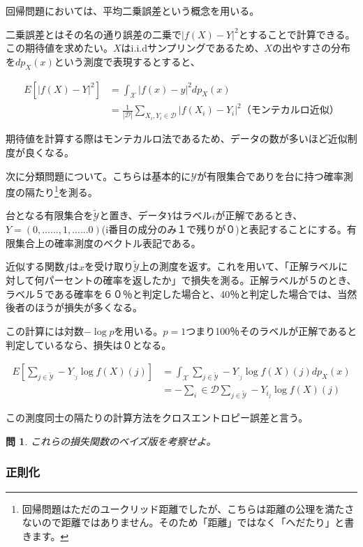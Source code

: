 \documentclass{jsarticle}
\newtheorem{pro}{問}[section]
\begin{document}
回帰問題においては、平均二乗誤差という概念を用いる。

二乗誤差とはその名の通り誤差の二乗で$|f(X)-Y|^2$とすることで計算できる。この期待値を求めたい。$X$はi.i.dサンプリングであるため、$X$の出やすさの分布を$dp_X(x)$という測度で表現するとすると、

\begin{align}
E[|f(X)-Y|^2]&=\int_\mathcal{X}|f(x)-y|^2dp_X(x)\\
&=\frac{1}{|\mathcal{D}|}\sum_{X_i,Y_i\in \mathcal{D}} |f(X_i)-Y_i|^2　（モンテカルロ近似）
\end{align}

期待値を計算する際はモンテカルロ法であるため、データの数が多いほど近似制度が良くなる。


次に分類問題について。こちらは基本的に$\mathcal{Y}$が有限集合でありを台に持つ確率測度の隔たり\footnote{回帰問題はただのユークリッド距離でしたが、こちらは距離の公理を満たさないので距離ではありません。そのため「距離」ではなく「へだたり」と書きます。}を測る。

台となる有限集合を$\tilde{\mathcal{Y}}$と置き、データ$Y$はラベル$i$が正解であるとき、$Y=(0,......,1,......0)$(i番目の成分のみ１で残りが０)と表記することにする。有限集合上の確率測度のベクトル表記である。

近似する関数$f$は$x$を受け取り$\tilde{\mathcal{Y}}$上の測度を返す。これを用いて、「正解ラベルに対して何パーセントの確率を返したか」で損失を測る。正解ラベルが５のとき、ラベル５である確率を６０％と判定した場合と、40％と判定した場合では、当然後者のほうが損失が多くなる。

この計算には対数$-\log{p}$を用いる。$p=1$つまり100％そのラベルが正解であると判定しているなら、損失は０となる。

\begin{align}
E[\sum_{j\in\tilde{\mathcal{Y}}} -Y_{\cdot_j} \log{f(X)(j)}]&=\int_\mathcal{X} \sum_{j\in\tilde{\mathcal{Y}}} -Y_{\cdot_j} \log{f(X)(j)}dp_{X}(x)\\
&=-\sum_i\in\mathcal{D} \sum_{j\in\tilde{\mathcal{Y}}} -Y_{i_j} \log{f(X)(j)}
\end{align}

この測度同士の隔たりの計算方法をクロスエントロピー誤差と言う。

\begin{pro}
これらの損失関数のベイズ版を考察せよ。
\end{pro}


\subsubsection{正則化}
\end{document}
